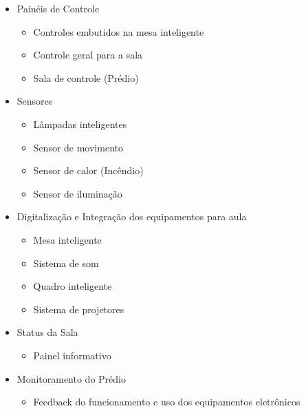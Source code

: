 \begin{apendicesenv}
\begin{itemize}
    \item Painéis de Controle
      \begin{itemize}
        \item Controles embutidos na mesa inteligente
        \item Controle geral para a sala
        \item Sala de controle (Prédio)
      \end{itemize}

    \item Sensores
      \begin{itemize}
        \item Lâmpadas inteligentes
        \item Sensor de movimento
        \item Sensor de calor (Incêndio)
        \item Sensor de iluminação
      \end{itemize}
    \item Digitalização e Integração dos equipamentos para aula
      \begin{itemize}
        \item Mesa inteligente
        \item Sistema de som
        \item Quadro inteligente
        \item Sistema de projetores
      \end{itemize}
    \item Status da Sala
      \begin{itemize}
        \item Painel informativo
      \end{itemize}
    \item Monitoramento do Prédio
      \begin{itemize}
        \item Feedback do funcionamento e uso dos equipamentos eletrônicos 
      \end{itemize}
  \end{itemize}
\end{apendicesenv}
